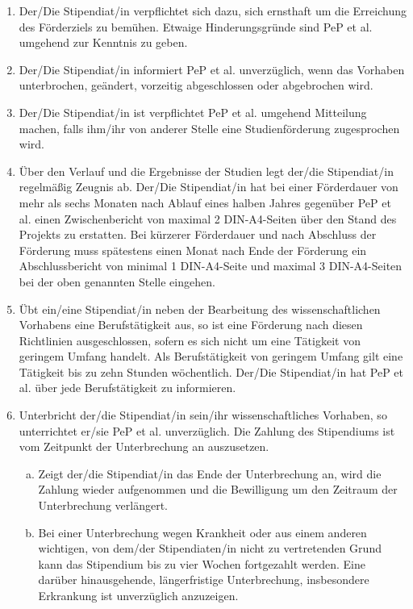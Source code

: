 \documentclass[
  paper=a4,
  fontsize=12pt,
  DIV=16,
  parskip=full,
  headinclude=true,
]{scrartcl}
\begin{document}
\begin{enumerate}[\qquad(1)]
	\item Der/Die Stipendiat/in verpflichtet sich dazu, sich ernsthaft um die
		Erreichung des Förderziels zu bemühen. Etwaige Hinderungsgründe sind
		PeP et al. umgehend zur Kenntnis zu geben.
	\item Der/Die Stipendiat/in informiert PeP et al. unverzüglich, wenn das
		Vorhaben unterbrochen, geändert, vorzeitig abgeschlossen oder
		abgebrochen wird.
	\item Der/Die Stipendiat/in ist verpflichtet PeP et al. umgehend
		Mitteilung machen, falls ihm/ihr von anderer Stelle eine
		Studienförderung zugesprochen wird.
	\item Über den Verlauf und die Ergebnisse der Studien legt der/die
		Stipendiat/in regelmäßig Zeugnis ab. Der/Die Stipendiat/in
		hat bei einer Förderdauer von mehr als sechs Monaten nach Ablauf
		eines halben Jahres gegenüber PeP et al. einen Zwischenbericht
		von maximal 2 DIN-A4-Seiten über den Stand des Projekts zu
		erstatten. Bei kürzerer Förderdauer und nach Abschluss der
		Förderung muss spätestens einen Monat nach Ende der Förderung
		ein Abschlussbericht von minimal 1 DIN-A4-Seite und maximal
		3 DIN-A4-Seiten bei der oben genannten Stelle eingehen. 
	\item Übt ein/eine Stipendiat/in neben der Bearbeitung des wissenschaftlichen
		Vorhabens eine Berufstätigkeit aus, so ist eine Förderung nach diesen
		Richtlinien ausgeschlossen, sofern es sich nicht um eine Tätigkeit von
		geringem Umfang handelt.
		Als Berufstätigkeit von geringem Umfang gilt eine Tätigkeit bis zu zehn
		Stunden wöchentlich. Der/Die Stipendiat/in hat PeP et al. über
		jede Berufstätigkeit zu informieren.
	\item Unterbricht der/die Stipendiat/in sein/ihr wissenschaftliches Vorhaben,
		so unterrichtet er/sie PeP et al. unverzüglich. Die Zahlung des
		Stipendiums ist vom Zeitpunkt der Unterbrechung an auszusetzen.
		\begin{enumerate}[(a)]
			\item  Zeigt der/die Stipendiat/in das Ende der Unterbrechung
				an, wird die Zahlung wieder aufgenommen und die
				Bewilligung um den Zeitraum der Unterbrechung verlängert.
			\item Bei einer Unterbrechung wegen Krankheit oder aus einem
				anderen wichtigen, von dem/der Stipendiaten/in nicht
				zu vertretenden Grund kann das Stipendium bis zu
				vier Wochen fortgezahlt werden. Eine darüber
				hinausgehende, längerfristige Unterbrechung,
				insbesondere Erkrankung ist unverzüglich anzuzeigen.
		\end{enumerate}
\end{enumerate}
\end{document}
